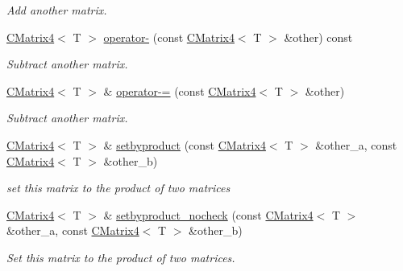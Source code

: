 \begin{DoxyCompactItemize}
\begin{DoxyCompactList}\small\item\em Add another matrix. \end{DoxyCompactList}\item 
\mbox{\label{classirr_1_1core_1_1CMatrix4_ada647d4659b652790436c6345ec11f3d}} 
\hyperlink{classirr_1_1core_1_1CMatrix4}{C\+Matrix4}$<$ T $>$ \hyperlink{classirr_1_1core_1_1CMatrix4_ada647d4659b652790436c6345ec11f3d}{operator-\/} (const \hyperlink{classirr_1_1core_1_1CMatrix4}{C\+Matrix4}$<$ T $>$ \&other) const
\begin{DoxyCompactList}\small\item\em Subtract another matrix. \end{DoxyCompactList}\item 
\mbox{\label{classirr_1_1core_1_1CMatrix4_a6d3031fc1609cbd2c6ad0ee209ea9e71}} 
\hyperlink{classirr_1_1core_1_1CMatrix4}{C\+Matrix4}$<$ T $>$ \& \hyperlink{classirr_1_1core_1_1CMatrix4_a6d3031fc1609cbd2c6ad0ee209ea9e71}{operator-\/=} (const \hyperlink{classirr_1_1core_1_1CMatrix4}{C\+Matrix4}$<$ T $>$ \&other)
\begin{DoxyCompactList}\small\item\em Subtract another matrix. \end{DoxyCompactList}\item 
\hyperlink{classirr_1_1core_1_1CMatrix4}{C\+Matrix4}$<$ T $>$ \& \hyperlink{classirr_1_1core_1_1CMatrix4_a8d2978907b0c746092e4c9891cf72893}{setbyproduct} (const \hyperlink{classirr_1_1core_1_1CMatrix4}{C\+Matrix4}$<$ T $>$ \&other\+\_\+a, const \hyperlink{classirr_1_1core_1_1CMatrix4}{C\+Matrix4}$<$ T $>$ \&other\+\_\+b)
\begin{DoxyCompactList}\small\item\em set this matrix to the product of two matrices \end{DoxyCompactList}\item 
\hyperlink{classirr_1_1core_1_1CMatrix4}{C\+Matrix4}$<$ T $>$ \& \hyperlink{classirr_1_1core_1_1CMatrix4_a65b8c0c066e1105b89fbbdb753ffabd8}{setbyproduct\+\_\+nocheck} (const \hyperlink{classirr_1_1core_1_1CMatrix4}{C\+Matrix4}$<$ T $>$ \&other\+\_\+a, const \hyperlink{classirr_1_1core_1_1CMatrix4}{C\+Matrix4}$<$ T $>$ \&other\+\_\+b)
\begin{DoxyCompactList}\small\item\em Set this matrix to the product of two matrices. \end{DoxyCompactList}\item 

\end{DoxyCompactItemize}
